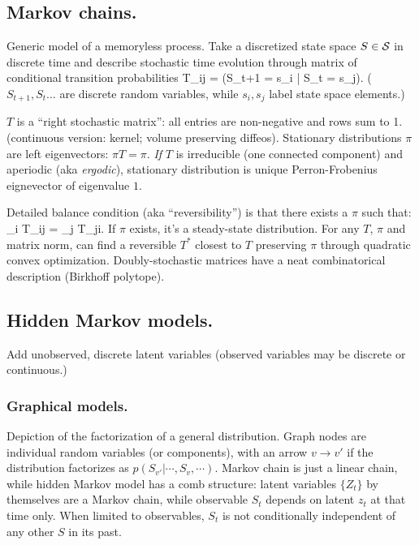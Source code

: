 \documentclass[notitlepage,openany,11pt]{report}
\numberwithin{equation}{section}
\theoremstyle{plain}%
\begin{document}
\subsection{Markov chains.} 
Generic model of a memoryless process. Take a discretized state space $S \in \mathcal{S}$ in discrete time and describe stochastic time evolution through matrix of conditional transition probabilities
\be
T_{ij} = (S_{t+1} = s_{i} | S_{t} = s_{j}).
\ee
($S_{t+1}, S_{t}...$ are discrete random variables, while $s_{i}, s_{j}$ label state space elements.)

$T$ is a ``right stochastic matrix'': all entries are non-negative and rows sum to 1. (continuous version: kernel; volume preserving diffeos). Stationary distributions $\pi$ are left eigenvectors: $\pi T = \pi$. \emph{If} $T$ is irreducible (one connected component) and aperiodic (aka \emph{ergodic}), stationary distribution is unique Perron-Frobenius eignevector of eigenvalue $1$.

Detailed balance condition (aka ``reversibility'') is that there exists a $\pi$ such that:
\be
\pi_{i} T_{ij} = \pi_{j} T_{ji}.
\ee
If $\pi$ exists, it's a steady-state distribution. For any $T$, $\pi$ and matrix norm, can find a reversible $T^{\ast}$ closest to $T$ preserving $\pi$ through quadratic convex optimization. Doubly-stochastic matrices have a neat combinatorical description (Birkhoff polytope).



\subsection{Hidden Markov models.} 
\label{sec-hidden-markov-models}

Add unobserved, discrete latent variables (observed variables may be discrete or continuous.)

\subsubsection{Graphical models.} Depiction of the factorization of a general distribution. Graph nodes are individual random variables (or components), with an arrow $v \to v'$ if the distribution factorizes as $p(S_{v'} | \cdots, S_{v}, \cdots)$. Markov chain is just a linear chain, while hidden Markov model has a comb structure: latent variables $\{Z_{t} \}$ by themselves are a Markov chain, while observable $S_{t}$ depends on latent $z_{t}$ at that time only. When limited to observables, $S_{t}$ is not conditionally independent of any other $S$ in its past.
\end{document}
